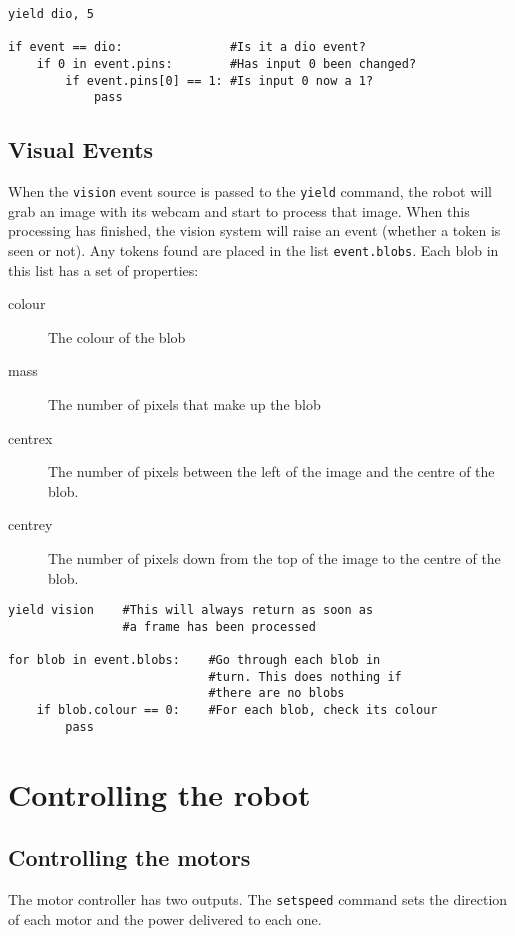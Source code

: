 \documentclass{article}
\begin{document}
\begin{verbatim}
yield dio, 5

if event == dio:               #Is it a dio event?
    if 0 in event.pins:        #Has input 0 been changed?
        if event.pins[0] == 1: #Is input 0 now a 1?
            pass
\end{verbatim}

\subsection{Visual Events}
When the \texttt{vision} event source is passed to the \texttt{yield}
command, the robot will grab an image with its webcam and start to
process that image.  When this processing has finished, the vision
system will raise an event (whether a token is seen or not).  Any
tokens found are placed in the list \texttt{event.blobs}.  Each blob in this
list has a set of properties:  
\begin{description}
\item[colour] The colour of the blob
\item[mass] The number of pixels that make up the blob
\item[centrex] The number of pixels between the left of the image and
  the centre of the blob.
\item[centrey] The number of pixels down from the top of the image to the
  centre of the blob.
\end{description}

\begin{verbatim}
yield vision    #This will always return as soon as
                #a frame has been processed

for blob in event.blobs:    #Go through each blob in 
                            #turn. This does nothing if
                            #there are no blobs
    if blob.colour == 0:    #For each blob, check its colour
        pass
\end{verbatim}

\section{Controlling the robot}
\subsection{Controlling the motors}
The motor controller has two outputs.  The \texttt{setspeed} command
sets the direction of each motor and the power delivered to each one.
\end{document}
